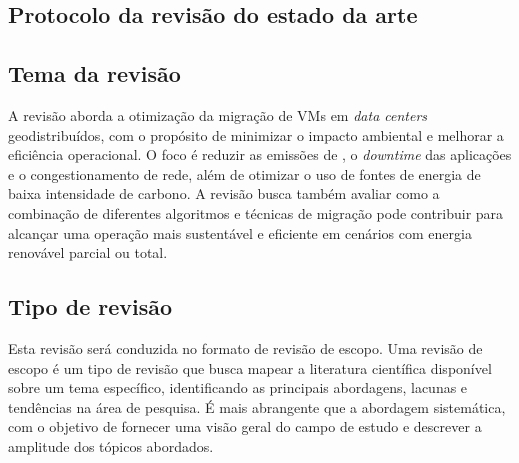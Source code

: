 \documentclass[
	12pt,				%
	oneside,			%
	a4paper,			%
	english,			%
	brazil				%
	]{abntex2ppgsi}
\begin{document}
\begin{apendicesenv}


%
%
%
\chapter{Protocolo da revisão do estado da arte}\label{chapter:protocolo-revisao-estado-da-arte}

\section{Tema da revisão}\label{section:tema-da-revisao}

A revisão aborda a otimização da migração de VMs em \textit{data centers} geodistribuídos, com o propósito de minimizar o impacto ambiental e melhorar a eficiência operacional. O foco é reduzir as emissões de , o \textit{downtime} das aplicações e o congestionamento de rede, além de otimizar o uso de fontes de energia de baixa intensidade de carbono. A revisão busca também avaliar como a combinação de diferentes algoritmos e técnicas de migração pode contribuir para alcançar uma operação mais sustentável e eficiente em cenários com energia renovável parcial ou total.

\section{Tipo de revisão}\label{section:tipo-de-revisao}

Esta revisão será conduzida no formato de revisão de escopo. Uma revisão de escopo é um tipo de revisão que busca mapear a literatura científica disponível sobre um tema específico, identificando as principais abordagens, lacunas e tendências na área de pesquisa. É mais abrangente que a abordagem sistemática, com o objetivo de fornecer uma visão geral do campo de estudo e descrever a amplitude dos tópicos abordados.


\end{apendicesenv}
\end{document}

